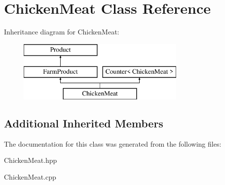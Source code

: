\hypertarget{class_chicken_meat}{}\section{Chicken\+Meat Class Reference}
\label{class_chicken_meat}
Inheritance diagram for Chicken\+Meat\+:\begin{figure}[H]
\begin{center}
\leavevmode
\includegraphics[height=3.000000cm]{class_chicken_meat}
\end{center}
\end{figure}
\subsection*{Additional Inherited Members}


The documentation for this class was generated from the following files\+:\begin{DoxyCompactItemize}
\item 
Chicken\+Meat.\+hpp\item 
Chicken\+Meat.\+cpp\end{DoxyCompactItemize}
